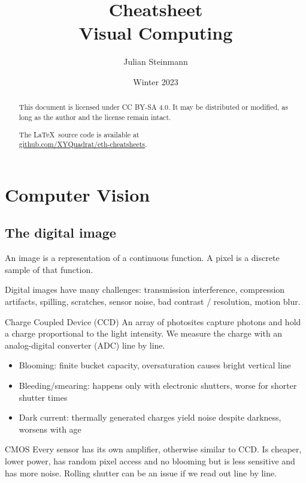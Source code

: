 \documentclass[a4paper,10pt]{article}
\title{Cheatsheet\\ Visual Computing}
\author{Julian Steinmann}
\date{\vspace{-10pt}Winter 2023}
\newcommand*\bad{\item[\textcolor{badred}{\(\bm{-}\)}]}
\begin{document}
\maketitle

\renewcommand{\abstractname}{License}
\begin{abstract}
	This document is licensed under CC BY-SA 4.0. It may be distributed or modified, as long as the author and the license remain intact.

	\begin{center}
	    The \LaTeX\ source code is available at \\ \href{https://github.com/XYQuadrat/eth-cheatsheets}{\color{brandblue}github.com/XYQuadrat/eth-cheatsheets}.
	\end{center}
\end{abstract}

\section{Computer Vision}
\subsection{The digital image}
An image is a representation of a continuous function. A pixel is a discrete sample of that function.

Digital images have many challenges: transmission interference, compression artifacts, spilling, scratches, sensor noise, bad contrast / resolution, motion blur.

\begin{subbox}{Charge Coupled Device (CCD)}
    An array of photosites capture photons and hold a charge proportional to the light intensity.
    We measure the charge with an analog-digital converter (ADC) line by line.
    \begin{itemize}
        \bad Blooming: finite bucket capacity, oversaturation causes bright vertical line
        \bad Bleeding/smearing: happens only with electronic shutters, worse for shorter shutter times
        \bad Dark current: thermally generated charges yield noise despite darkness, worsens with age
    \end{itemize}
\end{subbox}

\begin{subbox}{CMOS}
    Every sensor has its own amplifier, otherwise similar to CCD.
    Is cheaper, lower power, has random pixel access and no blooming but is less sensitive and has more noise.
    Rolling shutter can be an issue if we read out line by line.
\end{subbox}
\end{document}
